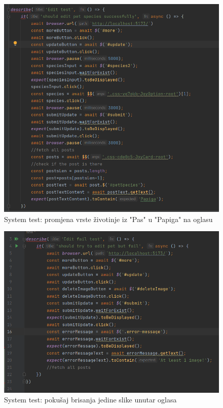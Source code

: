 			\begin{figure}[H]
				\includegraphics[scale=0.7]{slike/sysedit1.PNG} 
				\centering
				\caption{System test: promjena vrste životinje iz "Pas" u "Papiga" na oglasu}
				\label{sysedit1}
			\end{figure}
			
			
			\begin{figure}[H]
				\includegraphics[scale=0.7]{slike/sysedit2.PNG} 
				\centering
				\caption{System test: pokušaj brisanja jedine slike unutar oglasa}
				\label{sysedit1}
			\end{figure}
			
